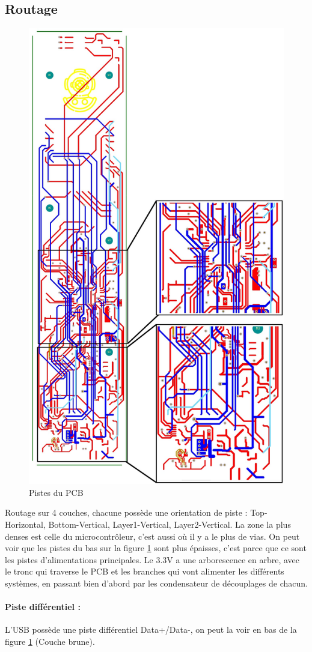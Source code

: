 \subsection{Routage} \label{ssec:routage}
{
	\begin{figure}[h]
		\centering
		\includegraphics[height=.67\textheight]{Figures/Pistes_PCB}
		\caption{Pistes du PCB}
		\label{fig:pistespcb}
	\end{figure}
	
	Routage sur 4 couches, chacune possède une orientation de piste : Top-Horizontal, Bottom-Vertical, Layer1-Vertical, Layer2-Vertical. La zone la plus denses est celle du microcontrôleur, c'est aussi où il y a le plus de vias. On peut voir que les pistes du bas sur la figure \ref{fig:pistespcb} sont plus épaisses, c'est parce que ce sont les pistes d'alimentations principales. Le 3.3V a une arborescence en arbre, avec le tronc qui traverse le PCB et les branches qui vont alimenter les différents systèmes, en passant bien d'abord par les condensateur de découplages de chacun. 
	\paragraph{Piste différentiel :} L'USB possède une piste différentiel Data+/Data-, on peut la voir en bas de la figure \ref{fig:pistespcb} (Couche brune).
}
\clearpage
